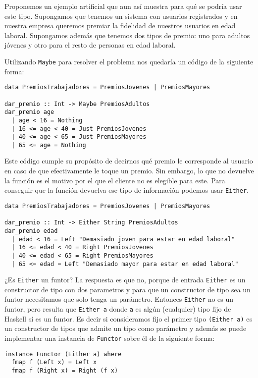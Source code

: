 Proponemos un ejemplo artificial que aun así muestra para qué se
podría usar este tipo. Supongamos que tenemos un sistema con usuarios
registrados y en nuestra empresa queremos premiar la fidelidad
de nuestros usuarios en edad laboral. Supongamos además que tenemos
dos tipos de premio: uno para adultos jóvenes y otro para el resto
de personas en edad laboral.

Utilizando \verb~Maybe~ para resolver el problema nos quedaría un código
de la siguiente forma:

\begin{verbatim}
data PremiosTrabajadores = PremiosJovenes | PremiosMayores

dar_premio :: Int -> Maybe PremiosAdultos
dar_premio age
  | age < 16 = Nothing
  | 16 <= age < 40 = Just PremiosJovenes
  | 40 <= age < 65 = Just PremiosMayores
  | 65 <= age = Nothing
\end{verbatim}

Este código cumple su propósito de decirnos qué premio
le corresponde al usuario en caso de que efectivamente le
toque un premio. Sin embargo, lo que no devuelve la función
es el motivo por el que el cliente no es elegible para este.
Para conseguir que la función devuelva ese tipo de información
podemos usar \verb~Either~.

\begin{verbatim}
data PremiosTrabajadores = PremiosJovenes | PremiosMayores

dar_premio :: Int -> Either String PremiosAdultos
dar_premio edad
  | edad < 16 = Left "Demasiado joven para estar en edad laboral"
  | 16 <= edad < 40 = Right PremiosJovenes
  | 40 <= edad < 65 = Right PremiosMayores
  | 65 <= edad = Left "Demasiado mayor para estar en edad laboral"
\end{verbatim}

¿Es \verb~Either~ un funtor? La respuesta es que no, porque de entrada
\verb~Either~ es un constructor de tipo con dos parametros y para que
un constructor de tipo sea un funtor necesitamos que solo tenga
un parámetro. Entonces \verb~Either~ no es un funtor, pero resulta que
\verb~Either a~ donde \verb~a~ es algún (cualquier) tipo fijo de Haskell sí
es un funtor. Es decir si consideramos fijo el primer tipo
\verb~(Either a)~ es un constructor de tipos que admite un tipo
como parámetro y además se puede implementar una instancia de
\verb~Functor~ sobre él de la siguiente forma:

\begin{verbatim}
instance Functor (Either a) where
  fmap f (Left x) = Left x
  fmap f (Right x) = Right (f x)
\end{verbatim}

